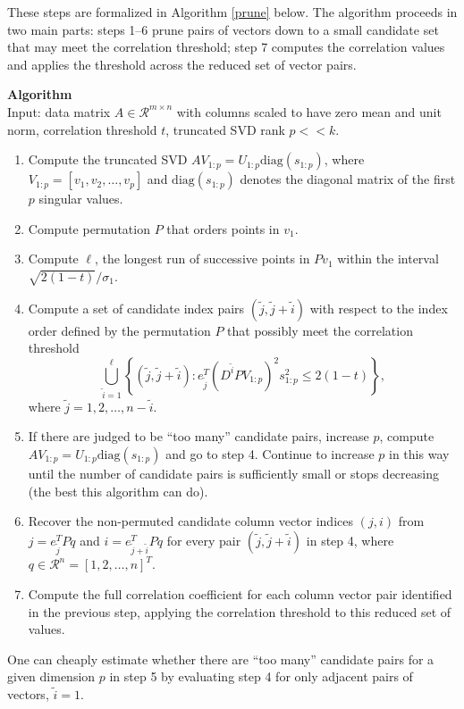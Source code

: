 \documentclass[article]{jss}
\newcounter{algorithmctr}
\newenvironment{algorithm}{
   \refstepcounter{algorithmctr}
   \bigskip\noindent
   \textbf{Algorithm \thealgorithmctr\\}
}
{\bigskip}
\numberwithin{algorithmctr}{section}
\begin{document}
These steps are formalized in Algorithm \ref{prune} below. The algorithm
proceeds in two main parts: steps 1--6 prune pairs of vectors down to a small
candidate set that may meet the correlation threshold; step 7
computes the correlation values and applies the threshold across the reduced
set of vector pairs.

\begin{algorithm}\label{prune}
Input: data matrix $A\in \mathcal{R}^{m\times n}$ with columns scaled to have
zero mean and unit norm, correlation threshold $t$,
truncated SVD rank $p<<k$.
\begin{enumerate}
\item Compute the truncated SVD
$AV_{1:p} = U_{1:p}\mathrm{diag}(s_{1:p})$,
where\\
$V_{1:p}=[v_1, v_2, \ldots, v_p]$
and $\mathrm{diag}(s_{1:p})$ denotes the diagonal matrix of the first $p$ singular values.
\item Compute permutation $P$ that orders points in $v_1$.
\item Compute $\ell$, the longest run of successive points in $P v_1$ within the interval $\sqrt{2(1-t)}/\sigma_1$.
\item Compute a set of candidate index pairs $(\tilde{j},\tilde{j}+\tilde{i})$ with respect to the index order defined by the permutation $P$ that possibly meet the correlation threshold
\[
\bigcup_{\tilde{i}=1}^\ell
\left\{
(\tilde{j},\tilde{j}+\tilde{i}) : 
e_{\tilde{j}}^T(D^{\tilde{i}} P V_{1:p} )^2 s_{1:p}^2 \le 2(1-t)
\right\},
\]
where $\tilde{j}=1,2,\ldots,n-\tilde{i}$.
\item If there are judged to be  ``too many'' candidate pairs, increase $p$,
compute $AV_{1:p} = U_{1:p}\mathrm{diag}(s_{1:p})$ and go to step 4.
Continue to increase $p$ in this way until the number of candidate
pairs is sufficiently small or stops decreasing (the best this algorithm can do).
\item Recover the non-permuted candidate column vector
indices $(j,i)$ from $j=e_{\tilde{j}}^T Pq$ and $i=e_{\tilde{j}+\tilde{i}}^TPq$ for every
pair $(\tilde{j},\tilde{j} + \tilde{i})$ in step 4, where
$q\in\mathcal{R}^n = [1,2,\ldots,n]^T$.
\item Compute the full correlation coefficient for each column vector pair identified in
the previous step, applying the correlation threshold to this reduced set of values.
\end{enumerate}
\end{algorithm}
One can cheaply estimate whether there are ``too many'' candidate pairs for a
given dimension $p$ in step 5 by evaluating step 4 for only adjacent pairs of
vectors, $\tilde{i}=1$.
\end{document}
